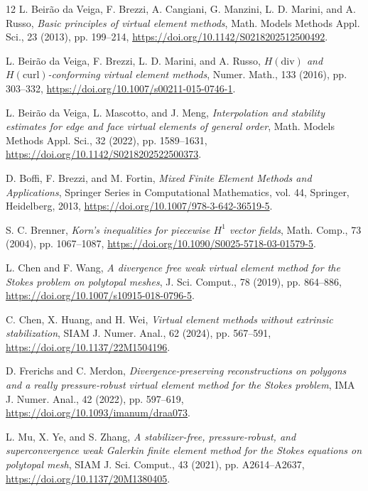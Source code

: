 \documentclass[review,hidelinks,onefignum,onetabnum]{siamart251216}
\begin{document}



\clearpage
\begin{thebibliography}{12}
L. Beir\~ao da Veiga, F. Brezzi, A. Cangiani, G. Manzini, L. D. Marini, and A. Russo,
\emph{Basic principles of virtual element methods},
Math. Models Methods Appl. Sci., 23 (2013), pp. 199--214,
\url{https://doi.org/10.1142/S0218202512500492}.

L. Beir\~ao da Veiga, F. Brezzi, L. D. Marini, and A. Russo,
\emph{$H(\mathrm{div})$ and $H(\mathrm{curl})$-conforming virtual element methods},
Numer. Math., 133 (2016), pp. 303--332,
\url{https://doi.org/10.1007/s00211-015-0746-1}.

L. Beir\~ao da Veiga, L. Mascotto, and J. Meng,
\emph{Interpolation and stability estimates for edge and face virtual elements of general order},
Math. Models Methods Appl. Sci., 32 (2022), pp. 1589--1631,
\url{https://doi.org/10.1142/S0218202522500373}.

D. Boffi, F. Brezzi, and M. Fortin,
\emph{Mixed Finite Element Methods and Applications},
Springer Series in Computational Mathematics, vol. 44, Springer, Heidelberg, 2013,
\url{https://doi.org/10.1007/978-3-642-36519-5}.

S. C. Brenner,
\emph{Korn's inequalities for piecewise $H^1$ vector fields},
Math. Comp., 73 (2004), pp. 1067--1087,
\url{https://doi.org/10.1090/S0025-5718-03-01579-5}.

L. Chen and F. Wang,
\emph{A divergence free weak virtual element method for the Stokes problem on polytopal meshes},
J. Sci. Comput., 78 (2019), pp. 864--886,
\url{https://doi.org/10.1007/s10915-018-0796-5}.

C. Chen, X. Huang, and H. Wei,
\emph{Virtual element methods without extrinsic stabilization},
SIAM J. Numer. Anal., 62 (2024), pp. 567--591,
\url{https://doi.org/10.1137/22M1504196}.

D. Frerichs and C. Merdon,
\emph{Divergence-preserving reconstructions on polygons and a really
pressure-robust virtual element method for the Stokes problem},
IMA J. Numer. Anal., 42 (2022), pp. 597--619,
\url{https://doi.org/10.1093/imanum/draa073}.

L. Mu, X. Ye, and S. Zhang,
\emph{A stabilizer-free, pressure-robust, and superconvergence weak Galerkin
finite element method for the Stokes equations on polytopal mesh},
SIAM J. Sci. Comput., 43 (2021), pp. A2614--A2637,
\url{https://doi.org/10.1137/20M1380405}.
\end{thebibliography}
\end{document}
